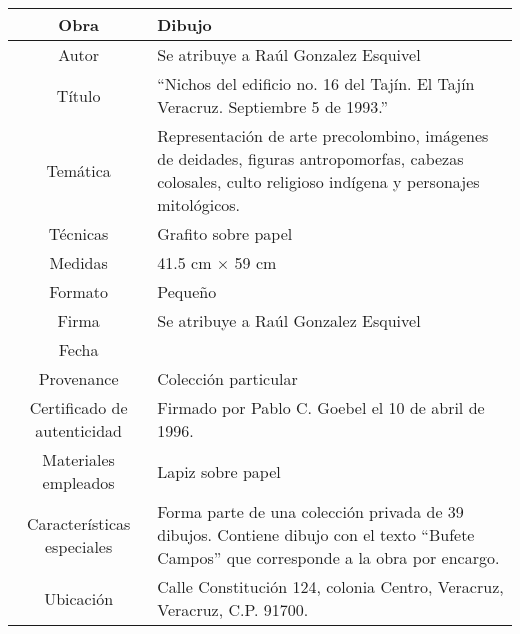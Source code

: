 \documentclass[10pt,letter]{report}
\begin{document}
\begin{table}[H]
\centering
\begin{tabular}{|c|m{}|}
\hline
Obra& Dibujo	\\
\hline
Autor & Se atribuye a Ra\'ul Gonzalez Esquivel\\
\hline
T\'itulo & ``Nichos del edificio no. 16 del Taj\'in. El Taj\'in Veracruz. Septiembre 5 de 1993.''\\
\hline
Tem\'atica & Representaci\'on de arte precolombino, im\'agenes de deidades, figuras antropomorfas, cabezas colosales, culto religioso ind\'igena y personajes mitol\'ogicos.\\
\hline
T\'ecnicas &Grafito sobre papel \\
\hline
Medidas & 41.5 cm $\times$ 59 cm \\
\hline
 Formato & Peque\~no \\
 \hline
 Firma & Se atribuye a Ra\'ul Gonzalez Esquivel  \\
 \hline
  Fecha & \\
 \hline
 Provenance & Colecci\'on particular\\
 \hline
 Certificado de autenticidad& Firmado por Pablo C. Goebel el 10 de abril de 1996.  \\
 \hline 
  Materiales empleados & Lapiz sobre papel\\
 \hline
 Caracter\'isticas especiales & Forma parte de una colecci\'on privada de 39 dibujos. 
Contiene dibujo con el texto ``Bufete Campos'' que corresponde a la obra por encargo. \\
\hline 
Ubicaci\'on & Calle Constituci\'on 124, colonia Centro, Veracruz, Veracruz, C.P. 91700.\\
\hline

\end{tabular}
\end{table}
\end{document}
